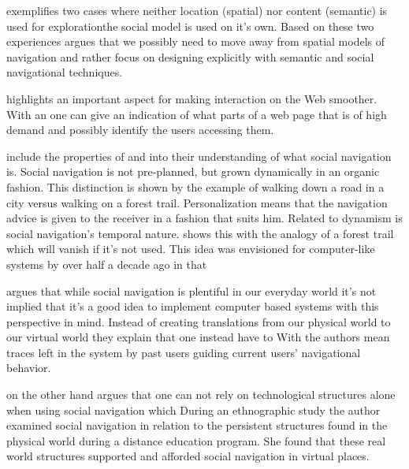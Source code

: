 \citeauthor{dourish94} exemplifies two cases where neither location
(spatial) nor content (semantic) is used for exploration\dash{}the social
model is used on it's own. Based on these two experiences
\citeauthor{dourish94} argues that we possibly need to move away from spatial
models of navigation and rather focus on designing explicitly with semantic
and social navigational techniques.

\citeauthor{dieberger97} highlights an important aspect for making interaction
on the Web smoother. With an
one can give an indication of what parts of a web page that is of high demand
and possibly identify the users accessing them.

\citet[p.~39]{dieberger00b} include the properties of 
and  into their understanding of what social navigation is.
Social navigation is not pre-planned, but grown dynamically in an organic
fashion. This distinction is shown by the example of walking down a road in a
city versus walking on a forest trail. Personalization means that the
navigation advice is given to the receiver in a fashion that suits him.
Related to dynamism is social navigation's temporal nature.
\citet[p.~39]{dieberger00b} shows this with the analogy of a forest trail
which will vanish if it's not used. This idea was envisioned for computer-like
systems by \citeauthor{bush45} over half a decade ago in that

\citet{svensson05} argues that while social navigation is plentiful in
our everyday world it's not implied that it's a good idea to implement
computer based systems with this perspective in mind. Instead of creating
translations from our physical world to our virtual world
they explain that one instead have to
With  the authors mean traces left in the system by past
users guiding current users' navigational behavior.

\citeauthor{robins02} on the other hand argues that one can not rely on
technological structures alone when using social navigation which
During an ethnographic study the author examined social navigation in relation
to the persistent structures found in the physical world during a distance
education program. She found that these real world structures supported and
afforded social navigation in virtual places.

